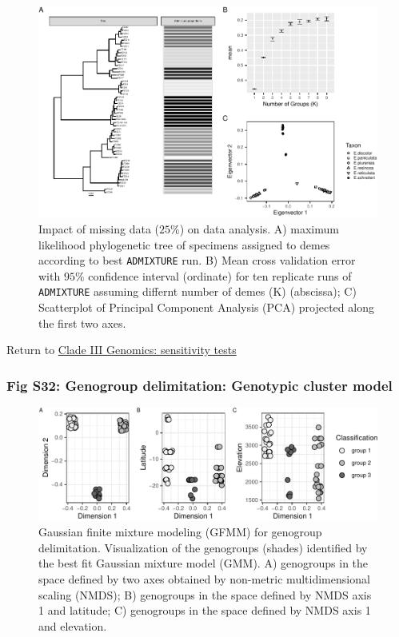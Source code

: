 \documentclass[
  11pt,
]{article}
\begin{document}
\begin{figure}
\includegraphics{Supplementary_Material_files/figure-latex/cladeIIIgenomicSensitivityAnalysesSmallestplots-1} \caption{Impact of missing data ($25\%$) on data analysis. A) maximum likelihood phylogenetic tree of specimens assigned to demes according to best \texttt{ADMIXTURE} run. B) Mean cross validation error with $95\%$ confidence interval (ordinate) for ten replicate runs of \texttt{ADMIXTURE} assuming differnt number of demes (K) (abscissa); C) Scatterplot of Principal Component Analysis (PCA) projected along the first two axes.}\label{fig:cladeIIIgenomicSensitivityAnalysesSmallestplots}
\end{figure}

Return to \protect\hyperlink{sensitivity-tests-2}{Clade III Genomics: sensitivity tests}
\pagebreak

\hypertarget{fig-s32-genogroup-delimitation-genotypic-cluster-model}{%
\subsubsection{Fig S32: Genogroup delimitation: Genotypic cluster model}\label{fig-s32-genogroup-delimitation-genotypic-cluster-model}}

\begin{figure}
\includegraphics{Supplementary_Material_files/figure-latex/cladeIIImolecularDelimitationsNmms-1} \caption{Gaussian finite mixture modeling (GFMM) for genogroup delimitation. Visualization of the genogroups (shades) identified by the best fit Gaussian mixture model (GMM). A) genogroups in the space defined by two axes obtained by non-metric multidimensional scaling (NMDS); B) genogroups in the space defined by NMDS axis 1 and latitude; C) genogroups in the space defined by NMDS axis 1 and elevation.}\label{fig:cladeIIImolecularDelimitationsNmms}
\end{figure}
\end{document}
